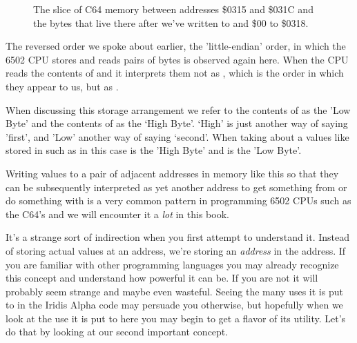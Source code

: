 \begin{figure}[H]
  {
    \setlength{\tabcolsep}{3.0pt}
    \setlength\cmidrulewidth{\heavyrulewidth} %
    \begin{adjustbox}{width=7cm,center}
    \end{adjustbox}
  }\caption{The slice of C64 memory between addresses \$0315 and \$031C and the bytes that live there after we've
written  to  and \$00 to \$0318.}
\end{figure}

The reversed order we spoke about earlier, the 'little-endian' order, in which the 6502 CPU stores and reads
pairs of bytes is observed again here. When the CPU reads the contents of  and 
it interprets them not as , which is the order in which they appear to us, but as .

When discussing this storage arrangement we refer to the contents of  as the 'Low Byte' and the
contents of  as the `High Byte'. `High' is just another way of saying 'first', and 'Low' another
way of saying `second'. When taking about a values like  stored in  such as in this case  is the
'High Byte' and  is the 'Low Byte'.

Writing values to a pair of adjacent addresses in memory like this so that they can
be subsequently interpreted as yet another address to get something from or do something with is a very common
pattern in programming 6502 CPUs such as the C64's and we will encounter it a \textit{lot} in this book.

It's a strange sort of indirection when you first attempt to understand it. Instead of storing actual values
at an address, we're storing an \textit{address} in the address. If you are familiar with other programming languages
you may already recognize this concept and understand how powerful it can be. If you are not it will probably
seem strange and maybe even wasteful. Seeing the many uses it is put to in the Iridis Alpha code may persuade
you otherwise, but hopefully when we look at the use it is put to here you may begin to get a flavor of its
utility. Let's do that by looking at our second important concept.

